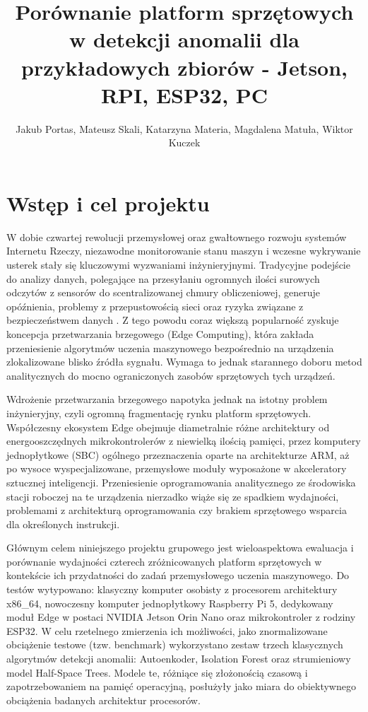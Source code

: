 \documentclass[12pt,twoside]{article}
\author{Jakub Portas, Mateusz Skali, Katarzyna Materia, Magdalena Matuła, Wiktor Kuczek}
\title{Porównanie platform sprzętowych w detekcji anomalii dla przykładowych zbiorów - Jetson, RPI, ESP32, PC}
\begin{document}
\maketitle

\tableofcontents

\clearpage


\section{Wstęp i cel projektu}
W dobie czwartej rewolucji przemysłowej oraz gwałtownego rozwoju systemów Internetu Rzeczy, niezawodne monitorowanie stanu maszyn i wczesne wykrywanie usterek stały się kluczowymi wyzwaniami inżynieryjnymi. Tradycyjne podejście do analizy danych, polegające na przesyłaniu ogromnych ilości surowych odczytów z sensorów do scentralizowanej chmury obliczeniowej, generuje opóźnienia, problemy z przepustowością sieci oraz ryzyka związane z bezpieczeństwem danych \cite{shi2016edge}. Z tego powodu coraz większą popularność zyskuje koncepcja przetwarzania brzegowego (Edge Computing), która zakłada przeniesienie algorytmów uczenia maszynowego bezpośrednio na urządzenia zlokalizowane blisko źródła sygnału. Wymaga to jednak starannego doboru metod analitycznych do mocno ograniczonych zasobów sprzętowych tych urządzeń.

Wdrożenie przetwarzania brzegowego napotyka jednak na istotny problem inżynieryjny, czyli ogromną fragmentację rynku platform sprzętowych. Współczesny ekosystem Edge obejmuje diametralnie różne architektury od energooszczędnych mikrokontrolerów z niewielką ilością pamięci, przez komputery jednopłytkowe (SBC) ogólnego przeznaczenia oparte na architekturze ARM, aż po wysoce wyspecjalizowane, przemysłowe moduły wyposażone w akceleratory sztucznej inteligencji. Przeniesienie oprogramowania analitycznego ze środowiska stacji roboczej na te urządzenia nierzadko wiąże się ze spadkiem wydajności, problemami z architekturą oprogramowania czy brakiem sprzętowego wsparcia dla określonych instrukcji.

Głównym celem niniejszego projektu grupowego jest wieloaspektowa ewaluacja i porównanie wydajności czterech zróżnicowanych platform sprzętowych w kontekście ich przydatności do zadań przemysłowego uczenia maszynowego. Do testów wytypowano: klasyczny komputer osobisty z procesorem architektury x86\_64, nowoczesny komputer jednopłytkowy Raspberry Pi 5, dedykowany moduł Edge w postaci NVIDIA Jetson Orin Nano oraz mikrokontroler z rodziny ESP32. W celu rzetelnego zmierzenia ich możliwości, jako znormalizowane obciążenie testowe (tzw. benchmark) wykorzystano zestaw trzech klasycznych algorytmów detekcji anomalii: Autoenkoder, Isolation Forest oraz strumieniowy model Half-Space Trees. Modele te, różniące się złożonością czasową i zapotrzebowaniem na pamięć operacyjną, posłużyły jako miara do obiektywnego obciążenia badanych architektur procesorów.
\end{document}
